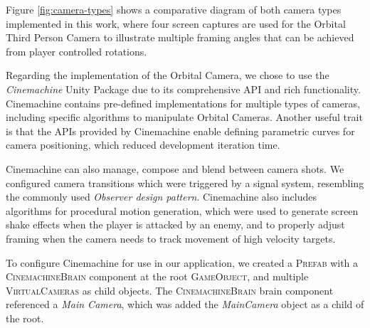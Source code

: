 Figure \ref{fig:camera-types} shows a comparative diagram of both camera types implemented in this work, where four screen captures are used for the Orbital Third Person Camera to illustrate multiple framing angles that can be achieved from player controlled rotations.



Regarding the implementation of the Orbital Camera, we chose to use the \emph{Cinemachine} Unity Package due to its comprehensive API and rich functionality. Cinemachine contains pre-defined implementations for multiple types of cameras, including specific algorithms to manipulate Orbital Cameras. Another useful trait is that the APIs provided by Cinemachine enable defining parametric curves for camera positioning, which reduced development iteration time.

Cinemachine can also manage, compose and blend between camera shots. We configured camera transitions which were triggered by a signal system, resembling the commonly used \emph{Observer design pattern}. Cinemachine also includes algorithms for procedural motion generation, which were used to generate screen shake effects when the player is attacked by an enemy, and to properly adjust framing when the camera needs to track movement of high velocity targets.



To configure Cinemachine for use in our application, we created a \textsc{Prefab} with a \textsc{CinemachineBrain} component at the root  \textsc{GameObject}, and multiple \textsc{VirtualCameras} as child objects. The \textsc{CinemachineBrain} brain component  referenced a \emph{Main Camera}, which was added the \emph{MainCamera} object as a child of the root.

